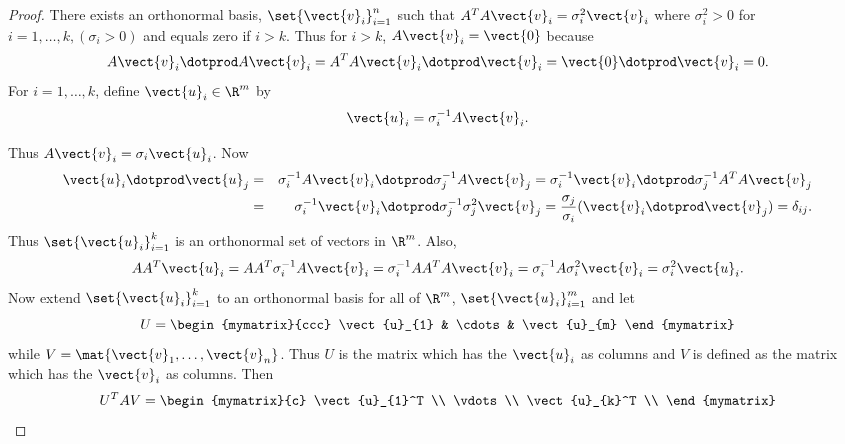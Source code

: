 \begin{proof}
There exists an orthonormal basis, $\set{\vect{v}_{i}} _{i=1}^{n}$ such that $
A^TA\vect{v}_{i}=\sigma _{i}^{2}\vect{v}_{i}$ where $\sigma
_{i}^{2}>0$ for $i=1,\ldots,k,(\sigma _{i}>0) $ and equals zero
if $i>k$. Thus for $i>k$, $A\vect{v}_{i}=\vect{0}$ because 
\begin{equation*}
 A\vect{v}_{i}\dotprod A\vect{v}_{i} = A^TA\vect{v}_{i} \dotprod \vect{v}_{i}  = \vect{0} \dotprod \vect{v}_{i} =0.
\end{equation*}
For $i=1,\ldots,k$, define $\vect{u}_{i}\in \R^{m}$ by 
\begin{equation*}
\vect{u}_{i}= \sigma _{i}^{-1}A\vect{v}_{i}.
\end{equation*}

Thus $A\vect{v}_{i}=\sigma _{i}\vect{u}_{i}$. Now 
\begin{eqnarray*}
\vect{u}_{i} \dotprod \vect{u}_{j} &=&  \sigma _{i}^{-1}A
\vect{v}_{i} \dotprod \sigma _{j}^{-1}A\vect{v}_{j}  = \sigma_{i}^{-1}\vect{v}_{i} \dotprod \sigma _{j}^{-1}A^TA\vect{v}_{j} \\
&=& \sigma _{i}^{-1}\vect{v}_{i} \dotprod \sigma _{j}^{-1}\sigma _{j}^{2} \vect{v}_{j} =
\frac{\sigma _{j}}{\sigma _{i}}(\vect{v}_{i} \dotprod \vect{v}_{j})
=\delta _{ij}.
\end{eqnarray*}
Thus $\set{\vect{u}_{i}} _{i=1}^{k}$ is an orthonormal set of
vectors in $\R^{m}$. Also, 
\begin{equation*}
AA^T\vect{u}_{i}=AA^T\sigma _{i}^{-1}A\vect{v}_{i}=\sigma
_{i}^{-1}AA^TA\vect{v}_{i}=\sigma _{i}^{-1}A\sigma _{i}^{2}\vect{v}
_{i}=\sigma _{i}^{2}\vect{u}_{i}.
\end{equation*}
Now extend $\set{\vect{u}_{i}} _{i=1}^{k}$ to an orthonormal
basis for all of $\R^{m}$, $\set{\vect{u}_{i}} _{i=1}^{m}$
and let 
\begin{equation*}
U= \begin{mymatrix}{ccc}
\vect{u}_{1} & \cdots & \vect{u}_{m}
\end{mymatrix}
\end{equation*}
while $V= \mat{\vect{v}_{1},\ldots,\vect{v}_{n}}$. Thus $U$
is the matrix which has the $\vect{u}_{i}$ as columns and $V$ is defined
as the matrix which has the $\vect{v}_{i}$ as columns. Then 
\begin{equation*}
U^TAV=\begin{mymatrix}{c}
\vect{u}_{1}^T \\ 
\vdots \\ 
\vect{u}_{k}^T \\ 

\end{mymatrix}
\end{equation*}
\end{proof}
